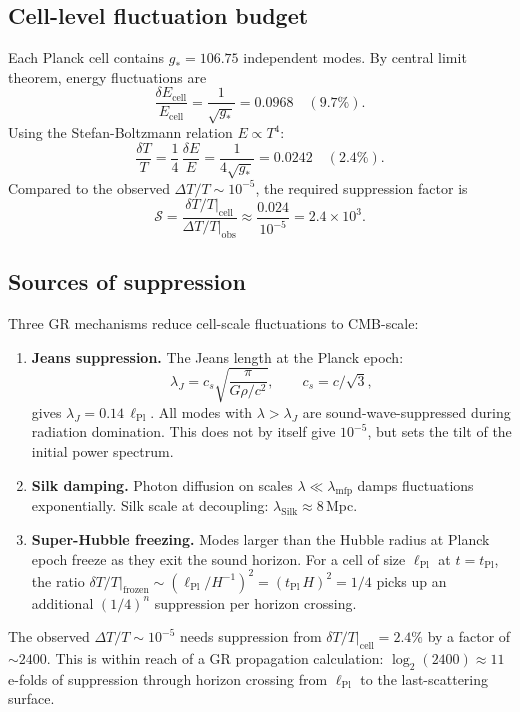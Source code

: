 \documentclass[12pt,a4paper]{article}
\theoremstyle{remark}
\newcommand{\tPl}{t_{\mathrm{Pl}}}
\newcommand{\lPl}{\ell_{\mathrm{Pl}}}
\newcommand{\gstar}{g_{*}}
\begin{document}
\subsection{Cell-level fluctuation budget}

Each Planck cell contains $\gstar = 106.75$ independent modes.
By central limit theorem, energy fluctuations are
\[
  \frac{\delta E_\mathrm{cell}}{E_\mathrm{cell}}
  = \frac{1}{\sqrt{\gstar}} = 0.0968 \quad (9.7\%).
\]
Using the Stefan-Boltzmann relation $E \propto T^4$:
\[
  \frac{\delta T}{T} = \frac{1}{4}\,\frac{\delta E}{E}
  = \frac{1}{4\sqrt{\gstar}} = 0.0242 \quad (2.4\%).
\]
Compared to the observed $\Delta T/T \sim 10^{-5}$, the required
suppression factor is
\[
  \mathcal{S} = \frac{\delta T/T|_\mathrm{cell}}{\Delta T/T|_\mathrm{obs}}
  \approx \frac{0.024}{10^{-5}} = 2.4\times10^3.
\]

\subsection{Sources of suppression}

Three GR mechanisms reduce cell-scale fluctuations to CMB-scale:

\begin{enumerate}
  \item \textbf{Jeans suppression.}
    The Jeans length at the Planck epoch:
    \[
      \lambda_J = c_s\sqrt{\frac{\pi}{G\rho/c^2}},\qquad c_s = c/\sqrt{3},
    \]
    gives $\lambda_J = 0.14\,\lPl$.
    All modes with $\lambda > \lambda_J$ are sound-wave-suppressed
    during radiation domination.
    This does not by itself give $10^{-5}$, but sets the tilt of the
    initial power spectrum.

  \item \textbf{Silk damping.}
    Photon diffusion on scales $\lambda \ll \lambda_\mathrm{mfp}$ damps
    fluctuations exponentially.
    Silk scale at decoupling: $\lambda_\mathrm{Silk} \approx 8$\,Mpc.

  \item \textbf{Super-Hubble freezing.}
    Modes larger than the Hubble radius at Planck epoch freeze as they
    exit the sound horizon.
    For a cell of size $\lPl$ at $t=\tPl$, the ratio
    $\delta T/T|_\mathrm{frozen} \sim (\lPl/H^{-1})^2 = (\tPl\,H)^2 = 1/4$
    picks up an additional $(1/4)^n$ suppression per horizon crossing.
\end{enumerate}

\begin{tcolorbox}[findingbox,title={Finding}]
The observed $\Delta T/T \sim 10^{-5}$ needs suppression from
$\delta T/T|_\mathrm{cell} = 2.4\%$ by a factor of $\sim2400$.
This is within reach of a GR propagation calculation: $\log_2(2400)
\approx 11$ e-folds of suppression through horizon crossing from
$\lPl$ to the last-scattering surface.
\end{tcolorbox}
\end{document}
